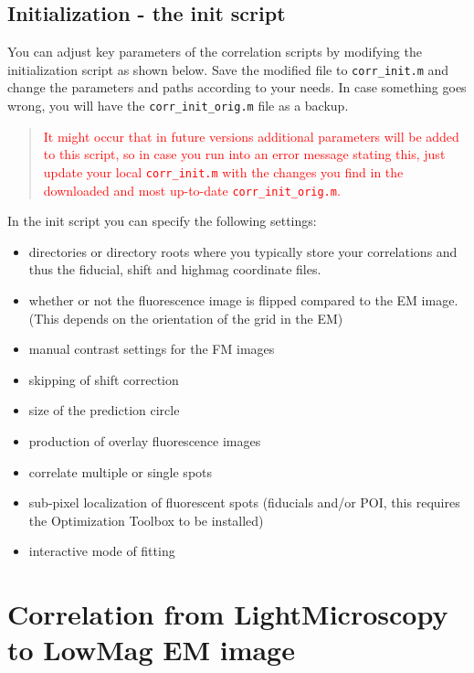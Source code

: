 \documentclass[10pt,a4paper,onepage,DIV12]{scrartcl}
\begin{document}
 \newpage
\subsection{Initialization - the init script}
\label{sec:init}
You can adjust key parameters of the correlation scripts by modifying the initialization script as shown below. Save the modified file to \texttt{corr\_init.m} and change the parameters and paths according to your needs. In case something goes wrong, you will have the \texttt{corr\_init\_orig.m} file as a backup.

\begin{quote}\textcolor{red}{
   It might occur that in future versions additional parameters will be added to this script, so in case you run into an error message stating this, just update your local \texttt{corr\_init.m} with the changes you find in the downloaded and most up-to-date \texttt{corr\_init\_orig.m}.}
 \end{quote}

In the init script you can specify the following settings:
\begin{itemize}
 \item directories or directory roots where you typically store your correlations and thus the fiducial, shift and highmag coordinate files.
 \item whether or not the fluorescence image is flipped compared to the EM image. (This depends on the orientation of the grid in the EM)
 \item manual contrast settings for the FM images
 \item skipping of shift correction
 \item size of the prediction circle
 \item production of overlay fluorescence images
 \item correlate multiple or single spots
 \item sub-pixel localization of fluorescent spots (fiducials and/or POI, this requires the Optimization Toolbox to be installed)
 \item interactive mode of fitting
\end{itemize}


\newpage
 
\newpage
\section{Correlation from LightMicroscopy to LowMag EM image}
\end{document}
